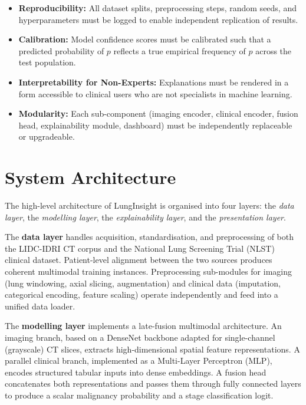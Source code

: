 {\begin{itemize}
    \item \textbf{Reproducibility:} All dataset splits, preprocessing steps, random seeds, and hyperparameters must be logged to enable independent replication of results.
    \item \textbf{Calibration:} Model confidence scores must be calibrated such that a predicted probability of $p$ reflects a true empirical frequency of $p$ across the test population.
    \item \textbf{Interpretability for Non-Experts:} Explanations must be rendered in a form accessible to clinical users who are not specialists in machine learning.
    \item \textbf{Modularity:} Each sub-component (imaging encoder, clinical encoder, fusion head, explainability module, dashboard) must be independently replaceable or upgradeable.
\end{itemize}


\section{System Architecture}

The high-level architecture of LungInsight is organised into four layers: the \textit{data layer}, the \textit{modelling layer}, the \textit{explainability layer}, and the \textit{presentation layer}.

The \textbf{data layer} handles acquisition, standardisation, and preprocessing of both the LIDC-IDRI CT corpus and the National Lung Screening Trial (NLST) clinical dataset. Patient-level alignment between the two sources produces coherent multimodal training instances. Preprocessing sub-modules for imaging (lung windowing, axial slicing, augmentation) and clinical data (imputation, categorical encoding, feature scaling) operate independently and feed into a unified data loader.

The \textbf{modelling layer} implements a late-fusion multimodal architecture. An imaging branch, based on a DenseNet backbone adapted for single-channel (grayscale) CT slices, extracts high-dimensional spatial feature representations. A parallel clinical branch, implemented as a Multi-Layer Perceptron (MLP), encodes structured tabular inputs into dense embeddings. A fusion head concatenates both representations and passes them through fully connected layers to produce a scalar malignancy probability and a stage classification logit.

}

